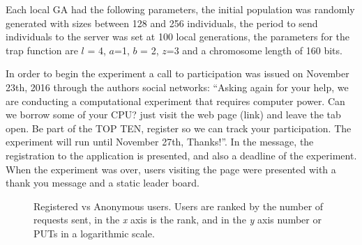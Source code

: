 \documentclass{llncs}
\begin{document}
Each local GA had the following parameters, the initial population was randomly generated 
with sizes between 128 and 256 individuals, the period to send individuals to the server
was set at 100 local generations, the parameters for the trap function are $l$ = 4,
$a$=1, $b$ = 2, $z$=3 and a chromosome length of 160 bits.

In order to begin the experiment a call to participation was issued on November 23th, 
2016 through the authors social networks:
``Asking again for your help, we are conducting a computational experiment
that requires computer power. Can we borrow some of your CPU? just visit the web page (link)
and leave the tab open. Be part of the TOP TEN, register so we can track your participation.
The experiment will run until November 27th, Thanks!''. In the message, the registration
to the application is presented, and also a deadline of the experiment. When the
experiment was over, users visiting the page were presented with a thank you message 
and a static leader board. 
\begin{figure}[t]
    \centering

    \caption{
        Registered vs Anonymous users.  Users are ranked by
        the number of requests sent, in the \emph{x} axis is the rank, and in the \emph{y} axis 
        number or PUTs in a logarithmic scale.    }
    \label{fig:puts}
\end{figure}
\end{document}
